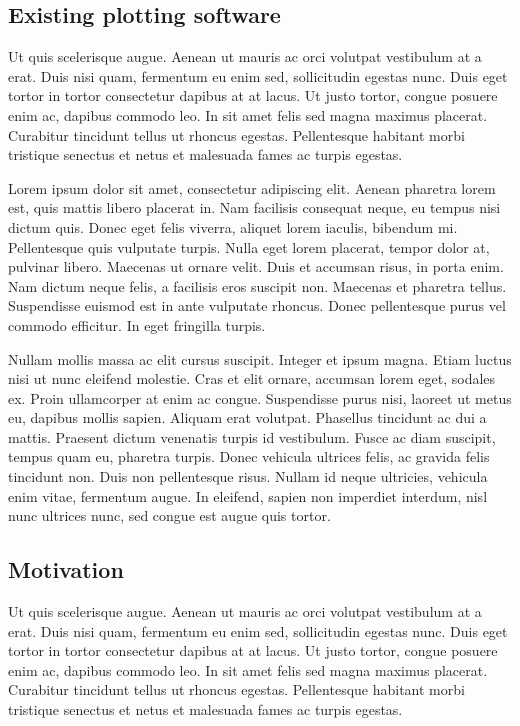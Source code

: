 \documentclass[article]{ojbs}  %
\begin{document}
\subsection{Existing plotting
software}\label{existing-plotting-software}
Ut quis scelerisque augue. Aenean ut mauris ac orci volutpat vestibulum at a erat. Duis nisi quam, fermentum eu enim sed, sollicitudin egestas nunc. Duis eget tortor in tortor consectetur dapibus at at lacus. Ut justo tortor, congue posuere enim ac, dapibus commodo leo. In sit amet felis sed magna maximus placerat. Curabitur tincidunt tellus ut rhoncus egestas. Pellentesque habitant morbi tristique senectus et netus et malesuada fames ac turpis egestas.

Lorem ipsum dolor sit amet, consectetur adipiscing elit. Aenean pharetra lorem est, quis mattis libero placerat in. Nam facilisis consequat neque, eu tempus nisi dictum quis. Donec eget felis viverra, aliquet lorem iaculis, bibendum mi. Pellentesque quis vulputate turpis. Nulla eget lorem placerat, tempor dolor at, pulvinar libero. Maecenas ut ornare velit. Duis et accumsan risus, in porta enim. Nam dictum neque felis, a facilisis eros suscipit non. Maecenas et pharetra tellus. Suspendisse euismod est in ante vulputate rhoncus. Donec pellentesque purus vel commodo efficitur. In eget fringilla turpis.

Nullam mollis massa ac elit cursus suscipit. Integer et ipsum magna. Etiam luctus nisi ut nunc eleifend molestie. Cras et elit ornare, accumsan lorem eget, sodales ex. Proin ullamcorper at enim ac congue. Suspendisse purus nisi, laoreet ut metus eu, dapibus mollis sapien. Aliquam erat volutpat. Phasellus tincidunt ac dui a mattis. Praesent dictum venenatis turpis id vestibulum. Fusce ac diam suscipit, tempus quam eu, pharetra turpis. Donec vehicula ultrices felis, ac gravida felis tincidunt non. Duis non pellentesque risus. Nullam id neque ultricies, vehicula enim vitae, fermentum augue. In eleifend, sapien non imperdiet interdum, nisl nunc ultrices nunc, sed congue est augue quis tortor.

\subsection{Motivation}\label{motivation}

Ut quis scelerisque augue. Aenean ut mauris ac orci volutpat vestibulum at a erat. Duis nisi quam, fermentum eu enim sed, sollicitudin egestas nunc. Duis eget tortor in tortor consectetur dapibus at at lacus. Ut justo tortor, congue posuere enim ac, dapibus commodo leo. In sit amet felis sed magna maximus placerat. Curabitur tincidunt tellus ut rhoncus egestas. Pellentesque habitant morbi tristique senectus et netus et malesuada fames ac turpis egestas.
\end{document}
